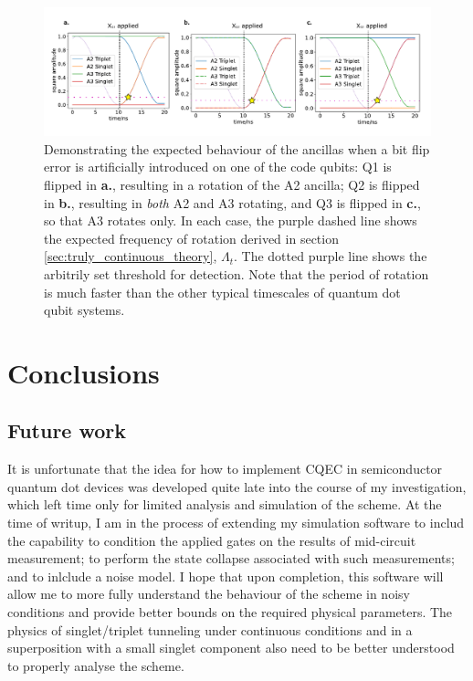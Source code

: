 \documentclass{report}
\begin{document}
\begin{figure}[ht]
    \centering
    \includegraphics[scale = 0.87]{Figures/flips.pdf}
    \caption{Demonstrating the expected behaviour of the ancillas when a bit flip error is artificially introduced on one of the code qubits: Q1 is flipped in \textbf{a.}, resulting in a rotation of the A2 ancilla; Q2 is flipped in \textbf{b.}, resulting in \textit{both} A2 and A3 rotating, and Q3 is flipped in \textbf{c.}, so that A3 rotates only. In each case, the purple dashed line shows the expected frequency of rotation derived in section \ref{sec:truly_continuous_theory}, $\Lambda_t$. The dotted purple line shows the arbitrily set threshold for detection. Note that the period of rotation is much faster than the other typical timescales of quantum dot qubit systems.
    }\label{fig:afterflip}
\end{figure}


\chapter {Conclusions}

\section{Future work}
It is unfortunate that the idea for how to implement CQEC in semiconductor quantum dot devices was developed quite late into the course of my investigation, which left time only for limited analysis and simulation of the scheme. At the time of writup, I am in the process of extending my simulation software to includ the capability to condition the applied gates on the results of mid-circuit measurement; to perform the state collapse associated with such measurements; and to inlclude a noise model. I hope that upon completion, this software will allow me to more fully understand the behaviour of the scheme in noisy conditions and provide better bounds on the required physical parameters. The physics of singlet/triplet tunneling under continuous conditions and in a superposition with a small singlet component also need to be better understood to properly analyse the scheme. 
\end{document}
